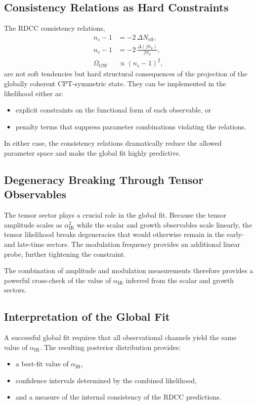 \documentclass[11pt,a4paper]{article}
\begin{document}
\subsection{Consistency Relations as Hard Constraints}

The RDCC consistency relations,
\begin{align}
    n_s - 1 &= -2\,\Delta N_{\mathrm{eff}}, \\
    n_s - 1 &= -2\,\frac{\Delta(f\sigma_8)}{f\sigma_8}, \\
    \Omega_{\mathrm{GW}} &\propto (n_s - 1)^2,
\end{align}
are not soft tendencies but hard structural consequences of the projection of the globally coherent
CPT-symmetric state. They can be implemented in the likelihood either as:
\begin{itemize}
    \item explicit constraints on the functional form of each observable, or
    \item penalty terms that suppress parameter combinations violating the relations.
\end{itemize}
In either case, the consistency relations dramatically reduce the allowed parameter space and
make the global fit highly predictive.

\subsection{Degeneracy Breaking Through Tensor Observables}

The tensor sector plays a crucial role in the global fit. Because the tensor amplitude scales as
$\alpha_{\mathrm{IR}}^2$ while the scalar and growth observables scale linearly, the tensor likelihood
breaks degeneracies that would otherwise remain in the early- and late-time sectors. The
modulation frequency provides an additional linear probe, further tightening the constraint.

The combination of amplitude and modulation measurements therefore provides a powerful
cross-check of the value of $\alpha_{\mathrm{IR}}$ inferred from the scalar and growth sectors.

\subsection{Interpretation of the Global Fit}

A successful global fit requires that all observational channels yield the same value of
$\alpha_{\mathrm{IR}}$. The resulting posterior distribution provides:
\begin{itemize}
    \item a best-fit value of $\alpha_{\mathrm{IR}}$,
    \item confidence intervals determined by the combined likelihood,
    \item and a measure of the internal consistency of the RDCC predictions.
\end{itemize}
\end{document}
